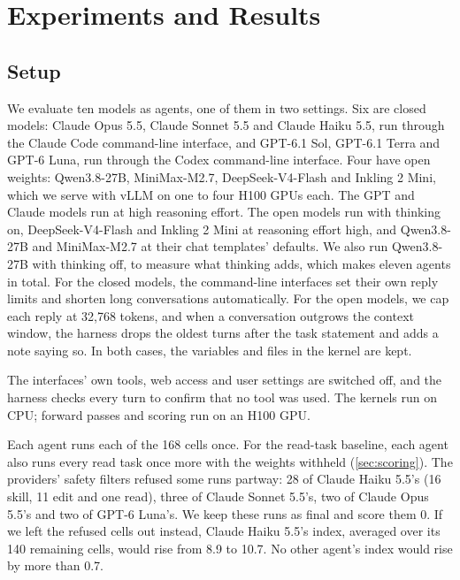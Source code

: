 \documentclass[11pt]{article}
\begin{document}
\section{Experiments and Results}\label{sec:experiments}

\subsection{Setup}\label{sec:setup}

We evaluate ten models as agents, one of them in two settings. Six are closed models: Claude Opus 5.5, Claude Sonnet 5.5 and Claude
Haiku 5.5, run through the Claude Code command-line interface, and GPT-6.1 Sol, GPT-6.1 Terra
and GPT-6 Luna, run through the Codex command-line interface. Four have open weights:
Qwen3.8-27B, MiniMax-M2.7, DeepSeek-V4-Flash and Inkling 2 Mini, which we serve with vLLM on
one to four H100 GPUs each. The GPT and Claude models run at
high reasoning effort. The open models run with thinking on, DeepSeek-V4-Flash
and Inkling 2 Mini at reasoning effort high, and Qwen3.8-27B and MiniMax-M2.7 at their chat
templates' defaults. We also run Qwen3.8-27B with thinking off, to measure what thinking adds,
which makes eleven agents in total. For the closed models, the command-line
interfaces set their own reply limits and shorten long conversations automatically. For the open
models, we cap each reply at 32,768 tokens, and when a conversation outgrows the context window,
the harness drops the oldest turns after the task statement and adds a note saying so. In both
cases, the variables and files in the kernel are kept.

The interfaces' own tools, web access and user settings are switched off, and the harness checks
every turn to confirm that no tool was used. The kernels run on CPU; forward passes and
scoring run on an H100 GPU.

Each agent runs each of the 168 cells once. For the read-task
baseline, each agent also runs every read task once more with the weights withheld
(\cref{sec:scoring}). The providers' safety filters refused some
runs partway: 28 of Claude Haiku 5.5's (16 skill, 11 edit and one read), three of Claude Sonnet
5.5's, two of Claude Opus 5.5's and two of GPT-6 Luna's. We keep these runs as final and score
them 0. If we left the refused cells out instead, Claude Haiku 5.5's index, averaged over its 140
remaining cells, would rise from 8.9 to 10.7. No other agent's index would rise by more than 0.7.
\end{document}
